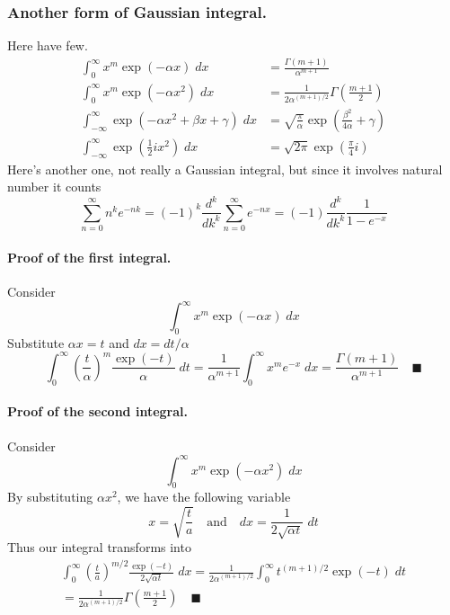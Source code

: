 \documentclass[../../main.tex]{subfiles}
\begin{document}
\subsubsection*{Another form of Gaussian integral.} Here have few.
\begin{align*}
    \int_{0}^{\infty} x^m\exp (-\alpha x)\;dx &= \frac{\Gamma (m+1)}{\alpha^{m+1}}\\
    \int_{0}^{\infty}x^m \exp\left(-\alpha x^2\right)\; dx&=\frac{1}{2\alpha^{(m+1)/2} }\Gamma\left(\frac{m+1}{2}\right)\\
    \int_{-\infty}^{\infty}\exp \left( -\alpha x^2+\beta x+\gamma\right)\;dx&= \sqrt{\frac{\pi}{\alpha}} \exp \left(\frac{\beta^2}{4\alpha}+\gamma\right)\\
    \int_{-\infty}^{\infty}\exp \left(\frac{1}{2}ix^2\right)\;dx& = \sqrt{2\pi}\exp \left(\frac{\pi}{4}i\right) 
\end{align*}
Here's another one, not really a Gaussian integral, but since it involves natural number it counts
\begin{equation*}
    \sum_{n=0}^{\infty}n^ke^{-nk}=(-1)^k\frac{d^k}{dk^k}\sum_{n=0}^{\infty}e^{-nx}=(-1)\frac{d^k}{dk^k}\frac{1}{1-e^{-x}}
\end{equation*}

\paragraph{Proof of the first integral.} Consider
\begin{equation*}
    \int_{0}^{\infty} x^m\exp (-\alpha x)\;dx
\end{equation*}
Substitute $\alpha x=t$ and $dx=dt/\alpha$
\begin{equation*}
    \int_{0}^{\infty} \left(\frac{t}{\alpha}\right)^m \frac{\exp(-t)}{\alpha}\;dt=\frac{1}{\alpha^{m+1}}\int_{0}^{\infty} x^{m}e^{-  x}\;dx=\frac{\Gamma (m+1)}{\alpha^{m+1}}\quad\blacksquare
\end{equation*}

\paragraph{Proof of the second integral.} Consider 
\begin{equation*}
    \int_{0}^{\infty}x^m \exp\left(-\alpha x^2\right)\; dx
\end{equation*}
By substituting $\alpha x^2$, we have the following variable
\begin{equation*}
    x=\sqrt{\frac{t}{a}}\quad\text{and}\quad dx=\frac{1}{2\sqrt{\alpha t}}\;dt
\end{equation*}
Thus our integral transforms into 
\begin{multline*}
    \int_{0}^{\infty}\left(\frac{t}{a}\right)^{m/2} \frac{\exp (-t)}{2\sqrt{\alpha t}}\; dx=\frac{1}{2\alpha^{(m+1)/2}} \int_{0}^{\infty} t^{(m+1)/2}\exp(-t)\;dt \\
    =\frac{1}{2\alpha^{(m+1)/2} }\Gamma\left(\frac{m+1}{2}\right)\quad \blacksquare
\end{multline*}
\end{document}
